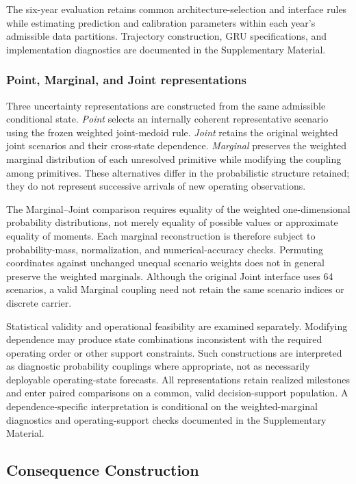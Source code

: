 The six-year evaluation retains common architecture-selection and interface rules while estimating prediction and calibration parameters within each year's admissible data partitions. Trajectory construction, GRU specifications, and implementation diagnostics are documented in the Supplementary Material.

\subsubsection{Point, Marginal, and Joint representations}

Three uncertainty representations are constructed from the same admissible conditional state. \emph{Point} selects an internally coherent representative scenario using the frozen weighted joint-medoid rule. \emph{Joint} retains the original weighted joint scenarios and their cross-state dependence. \emph{Marginal} preserves the weighted marginal distribution of each unresolved primitive while modifying the coupling among primitives. These alternatives differ in the probabilistic structure retained; they do not represent successive arrivals of new operating observations.

The Marginal--Joint comparison requires equality of the weighted one-dimensional probability distributions, not merely equality of possible values or approximate equality of moments. Each marginal reconstruction is therefore subject to probability-mass, normalization, and numerical-accuracy checks. Permuting coordinates against unchanged unequal scenario weights does not in general preserve the weighted marginals. Although the original Joint interface uses 64 scenarios, a valid Marginal coupling need not retain the same scenario indices or discrete carrier.

Statistical validity and operational feasibility are examined separately. Modifying dependence may produce state combinations inconsistent with the required operating order or other support constraints. Such constructions are interpreted as diagnostic probability couplings where appropriate, not as necessarily deployable operating-state forecasts. All representations retain realized milestones and enter paired comparisons on a common, valid decision-support population. A dependence-specific interpretation is conditional on the weighted-marginal diagnostics and operating-support checks documented in the Supplementary Material.

\subsection{Consequence Construction}
\label{subsec:consequence_construction}

